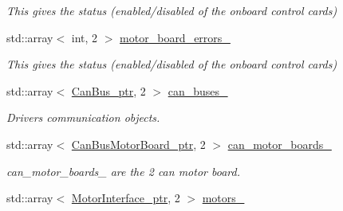 \begin{DoxyCompactItemize}
\begin{DoxyCompactList}\small\item\em This gives the status (enabled/disabled of the onboard control cards) \end{DoxyCompactList}\item 
std\+::array$<$ int, 2 $>$ \hyperlink{classblmc__robots_1_1Teststand_a89f931457834d37bd01da57944fd21c1}{motor\+\_\+board\+\_\+errors\+\_\+}\hypertarget{classblmc__robots_1_1Teststand_a89f931457834d37bd01da57944fd21c1}{}\label{classblmc__robots_1_1Teststand_a89f931457834d37bd01da57944fd21c1}

\begin{DoxyCompactList}\small\item\em This gives the status (enabled/disabled of the onboard control cards) \end{DoxyCompactList}\item 
std\+::array$<$ \hyperlink{common__header_8hpp_a793c8789a7598e8aaf766939da7262af}{Can\+Bus\+\_\+ptr}, 2 $>$ \hyperlink{classblmc__robots_1_1Teststand_aab9d6924ad67f65a6931d3db4771c28a}{can\+\_\+buses\+\_\+}
\begin{DoxyCompactList}\small\item\em Drivers communication objects. \end{DoxyCompactList}\item 
std\+::array$<$ \hyperlink{common__header_8hpp_aab1c6ddb1273247a1b45d5e8b417c216}{Can\+Bus\+Motor\+Board\+\_\+ptr}, 2 $>$ \hyperlink{classblmc__robots_1_1Teststand_a5ab181273e83c54a66ece2f741b718bb}{can\+\_\+motor\+\_\+boards\+\_\+}\hypertarget{classblmc__robots_1_1Teststand_a5ab181273e83c54a66ece2f741b718bb}{}\label{classblmc__robots_1_1Teststand_a5ab181273e83c54a66ece2f741b718bb}

\begin{DoxyCompactList}\small\item\em can\+\_\+motor\+\_\+boards\+\_\+ are the 2 can motor board. \end{DoxyCompactList}\item 
std\+::array$<$ \hyperlink{common__header_8hpp_ae1a0f9992bc8fbbc1943d887f517c180}{Motor\+Interface\+\_\+ptr}, 2 $>$ \hyperlink{classblmc__robots_1_1Teststand_ae530206f8c54cbc04d7cf69a16d1e99a}{motors\+\_\+}\hypertarget{classblmc__robots_1_1Teststand_ae530206f8c54cbc04d7cf69a16d1e99a}{}\label{classblmc__robots_1_1Teststand_ae530206f8c54cbc04d7cf69a16d1e99a}


\end{DoxyCompactItemize}
